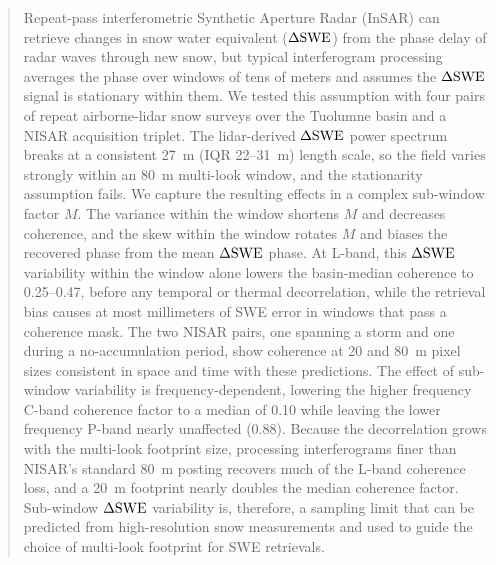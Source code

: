 \documentclass[journal abbreviation, manuscript]{copernicus}
\begin{document}
\begin{abstract}
Repeat-pass interferometric Synthetic Aperture Radar (InSAR) can retrieve changes in snow water equivalent ($\dswe$) from the phase delay of radar waves through new snow, but typical interferogram processing averages the phase over windows of tens of meters and assumes the $\dswe$ signal is stationary within them. We tested this assumption with four pairs of repeat airborne-lidar snow surveys over the Tuolumne basin and a NISAR acquisition triplet. The lidar-derived $\dswe$ power spectrum breaks at a consistent 27~m (IQR 22--31~m) length scale, so the field varies strongly within an 80~m multi-look window, and the stationarity assumption fails. We capture the resulting effects in a complex sub-window factor $M$. The variance within the window shortens $M$ and decreases coherence, and the skew within the window rotates $M$ and biases the recovered phase from the mean $\dswe$ phase. At L-band, this $\dswe$ variability within the window alone lowers the basin-median coherence to 0.25--0.47, before any temporal or thermal decorrelation, while the retrieval bias causes at most millimeters of SWE error in windows that pass a coherence mask. The two NISAR pairs, one spanning a storm and one during a no-accumulation period, show coherence at 20 and 80~m pixel sizes consistent in space and time with these predictions. The effect of sub-window variability is frequency-dependent, lowering the higher frequency C-band coherence factor to a median of 0.10 while leaving the lower frequency P-band nearly unaffected (0.88). Because the decorrelation grows with the multi-look footprint size, processing interferograms finer than NISAR's standard 80~m posting recovers much of the L-band coherence loss, and a 20~m footprint nearly doubles the median coherence factor. Sub-window $\dswe$ variability is, therefore, a sampling limit that can be predicted from high-resolution snow measurements and used to guide the choice of multi-look footprint for SWE retrievals.
\end{abstract}


\end{document}
